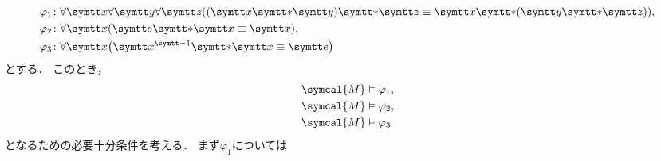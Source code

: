 \begin{align*}
	\varphi_1 \colon & \forall \obj{x} \forall \obj{y} \forall \obj{z}
	\paren{\paren{\obj{x} \obj{\ast} \obj{y}} \obj{\ast} \obj{z} \objeq \obj{x} \obj{\ast} \paren{\obj{y} \obj{\ast} \obj{z}}}, \\
	\varphi_2 \colon & \forall \obj{x} \paren{\obj{e} \obj{\ast} \obj{x} \objeq \obj{x}},                                       \\
	\varphi_3 \colon & \forall \obj{x} \paren{\obj{x}^{\obj{-1}} \obj{\ast} \obj{x} \objeq \obj{e}}
\end{align*}
とする．
このとき，
\begin{align*}
	\symcal{M} & \satisfy \varphi_1, \\
	\symcal{M} & \satisfy \varphi_2, \\
	\symcal{M} & \satisfy \varphi_3  \\
\end{align*}
となるための必要十分条件を考える．
まず\(\varphi_1\)については
